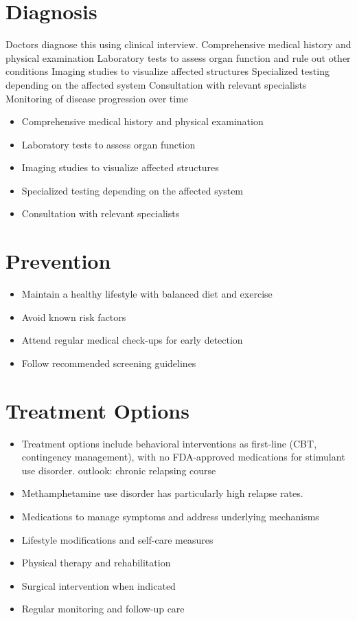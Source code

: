 \section{Diagnosis}
Doctors diagnose this using clinical interview. Comprehensive medical history and physical examination Laboratory tests to assess organ function and rule out other conditions Imaging studies to visualize affected structures Specialized testing depending on the affected system Consultation with relevant specialists Monitoring of disease progression over time

\begin{itemize}[noitemsep]
  \item Comprehensive medical history and physical examination
  \item Laboratory tests to assess organ function
  \item Imaging studies to visualize affected structures
  \item Specialized testing depending on the affected system
  \item Consultation with relevant specialists
\end{itemize}
\section{Prevention}
\begin{itemize}[noitemsep]
  \item Maintain a healthy lifestyle with balanced diet and exercise
  \item Avoid known risk factors
  \item Attend regular medical check-ups for early detection
  \item Follow recommended screening guidelines
\end{itemize}
\section{Treatment Options}
\begin{itemize}[noitemsep]
  \item Treatment options include behavioral interventions as first-line (CBT, contingency management), with no FDA-approved medications for stimulant use disorder. outlook: chronic relapsing course
  \item Methamphetamine use disorder has particularly high relapse rates.
  \item Medications to manage symptoms and address underlying mechanisms
  \item Lifestyle modifications and self-care measures
  \item Physical therapy and rehabilitation
  \item Surgical intervention when indicated
  \item Regular monitoring and follow-up care
\end{itemize}
